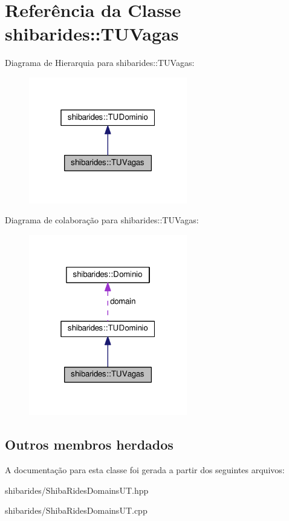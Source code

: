\hypertarget{classshibarides_1_1TUVagas}{}\section{Referência da Classe shibarides\+:\+:T\+U\+Vagas}
\label{classshibarides_1_1TUVagas}


Diagrama de Hierarquia para shibarides\+:\+:T\+U\+Vagas\+:\nopagebreak
\begin{figure}[H]
\begin{center}
\leavevmode
\includegraphics[width=196pt]{classshibarides_1_1TUVagas__inherit__graph}
\end{center}
\end{figure}


Diagrama de colaboração para shibarides\+:\+:T\+U\+Vagas\+:\nopagebreak
\begin{figure}[H]
\begin{center}
\leavevmode
\includegraphics[width=196pt]{classshibarides_1_1TUVagas__coll__graph}
\end{center}
\end{figure}
\subsection*{Outros membros herdados}


A documentação para esta classe foi gerada a partir dos seguintes arquivos\+:\begin{DoxyCompactItemize}
\item 
shibarides/Shiba\+Rides\+Domains\+U\+T.\+hpp\item 
shibarides/Shiba\+Rides\+Domains\+U\+T.\+cpp\end{DoxyCompactItemize}
